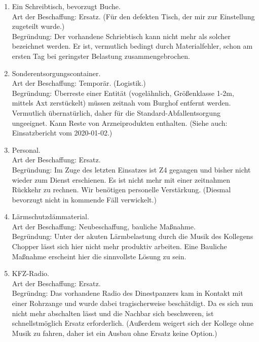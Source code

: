 \begin{enumerate}[leftmargin=*, itemsep=1ex]
  \item Ein Schreibtisch, bevorzugt Buche. \\
    Art der Beschaffung: Ersatz. (Für den defekten Tisch, der mir zur Einstellung zugeteilt wurde.) \\
    Begründung:
      Der vorhandene Schriebtisch kann nicht mehr als solcher bezeichnet werden.
      Er ist, vermutlich bedingt durch Materialfehler, schon am ersten Tag bei geringster Belastung zusammengebrochen.

  \item Sonderentsorgungscontainer. \\
    Art der Beschaffung: Temporär. (Logistik.) \\%
    Begründung:
      Überreste einer Entität (vogelähnlich, Größenklasse 1-2m, mittels Axt zerstückelt) müssen zeitnah vom Burghof entfernt werden.
      Vermutlich übernatürlich, daher für die Standard-Abfallentsorgung ungeeignet.
      Kann Reste von Arzneiprodukten enthalten.
      (Siehe auch: Einsatzbericht vom 2020-01-02.)

  \item Personal. \\
    Art der Beschaffung: Ersatz. \\
    Begründung:
      Im Zuge des letzten Einsatzes ist Z4 gegangen und bisher nicht wieder zum Dienst erschienen.
      Es ist nicht mehr mit einer zeitnahmen Rückkehr zu rechnen.
      Wir benötigen personelle Verstärkung.
      (Diesmal bevorzugt nicht in kommende Fäll verwickelt.)

  \item Lärmschutzdämmaterial. \\
    Art der Beschaffung: Neubeschaffung, bauliche Maßnahme. \\
    Begründung:
      Unter der akuten Lärmbelastung durch die Musik des Kollegens Chopper lässt sich hier nicht mehr produktiv arbeiten.
      Eine Bauliche Maßnahme erscheint hier die sinnvollste Lösung zu sein.

  \item KFZ-Radio. \\
    Art der Beschaffung: Ersatz. \\
    Begründng:
      Das vorhandene Radio des Dinestpanzers kam in Kontakt mit einer Rohrzange und wurde dabei tragischerweise beschätdigt.
      Da es sich nun nicht mehr abschalten lässt und die Nachbar sich beschweren, ist schnellstmöglich Ersatz erforderlich.
      (Außerdem weigert sich der Kollege ohne Musik zu fahren, daher ist ein Ausbau ohne Ersatz keine Option.)
\end{enumerate}

